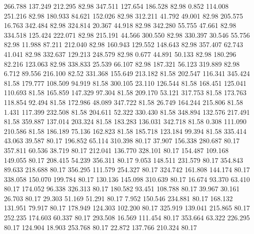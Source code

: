  266.788  137.249  212.295        82.98
 347.511  127.654  186.528        82.98
   0.852  114.008  251.216        82.98
 180.933   84.621  152.026        82.98
 312.211   41.792   49.001        82.98
 205.575   16.763  342.484        82.98
 324.814   20.367   44.918        82.98
 342.280   55.755   47.661        82.98
 334.518  125.424  222.071        82.98
 215.191   44.566  300.550        82.98
 330.397   30.546   55.756        82.98
  11.988   87.211  212.040        82.98
 160.943  129.552  148.643        82.98
 357.407   62.743   41.041        82.98
 332.637  129.213  248.579        82.98
   0.677   44.891   50.133        82.98
 180.296   82.216  123.063        82.98
 338.833   25.539   66.107        82.98
 187.321   56.123  319.889        82.98
   6.712   89.556  216.100        82.52
 331.368  155.649  213.182        81.58
 202.547  116.341  345.424        81.58
 179.777  108.509   94.919        81.58
 300.105   23.110  126.544        81.58
 168.451  125.041  110.693        81.58
 165.859  147.329   97.304        81.58
 209.170   53.121  317.753        81.58
 173.763  118.854   92.494        81.58
 172.986   48.089  347.722        81.58
  26.749  164.244  215.806        81.58
   1.431  117.399  232.508        81.58
 204.611   52.322  330.430        81.58
 348.894  132.576  217.491        81.58
 359.887  137.014  203.324        81.58
 183.283  136.031  342.718        81.58
   0.308  111.090  210.586        81.58
 186.189   75.136  162.823        81.58
 185.718  123.184   99.394        81.58
 335.414   43.063   39.587        80.17
 196.852   65.114  310.398        80.17
  37.907  156.338  280.687        80.17
 357.811   60.536   38.719        80.17
 212.041  136.770  328.101        80.17
 154.487  109.168  149.055        80.17
 208.415   54.239  356.311        80.17
   9.053  148.511  231.579        80.17
 354.843   89.633  218.688        80.17
 356.295  111.579  254.327        80.17
 324.742  161.808  144.174        80.17
 338.058  150.070  199.784        80.17
 130.136  145.098  310.639        80.17
  16.674   93.370   63.410        80.17
 174.052   96.338  326.313        80.17
 180.582   93.451  108.788        80.17
  39.967   30.161   26.703        80.17
  29.303   51.169   51.291        80.17
   7.952  150.546  234.881        80.17
 168.132  131.951   79.917        80.17
 178.949  124.303  102.200        80.17
 325.919  139.041  215.865        80.17
 252.235  174.603   60.337        80.17
 293.508   16.569  111.454        80.17
 353.664   63.322  226.295        80.17
 124.904   18.903  253.768        80.17
  22.872  137.766  210.324        80.17
